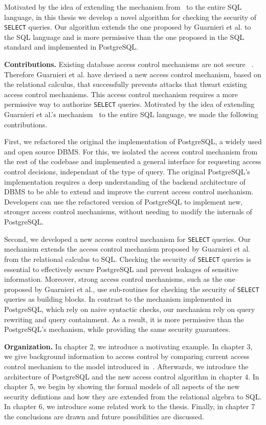 Motivated by the idea of extending the mechanism from~\cite{guarnieri2016strong} to the entire SQL language, in this thesis we develop a novel algorithm for checking the security of \texttt{SELECT} queries.
%
Our algorithm extends the one proposed by Guarnieri et al. to the SQL language and is more permissive than the one proposed in the SQL standard and  implemented in PostgreSQL.

\smallskip
\noindent
{\bf Contributions.}
Existing database access control mechanisms are not secure~\cite{guarnieri2016strong} . 
%
Therefore Guarnieri et al. have devised a new access control mechanism, based on the relational calculus, that successfully prevents attacks that thwart existing access control mechanisms.
%
This access control mechanism requires a more permissive way to authorize \texttt{SELECT} queries.
%
Motivated by the idea of extending Guarnieri et al.'s mechanism~\cite{guarnieri2016strong} to the entire SQL language,  we made the following contributions.

First, we refactored the original the implementation of PostgreSQL, a widely used and open source DBMS.
%
For this, we isolated the access control mechanism from the rest of the codebase and implemented a general interface for requesting access control decisions, independant of the type of query.
%
The original PostgreSQL's implementation requires a deep understanding of the backend architecture of DBMS to be able to extend and improve the current access control mechanism.
%
Developers can use the refactored version of PostgreSQL to implement new, stronger access control mechanisms, without needing to modify the internals of PostgreSQL.

Second, we developed a new access control mechanism for \texttt{SELECT} queries.
%
Our mechanism extends the access control mechanism proposed by Guarnieri et al.~\cite{guarnieri2016strong} from the relational calculus to SQL.
%
Checking the security of \texttt{SELECT} queries is essential to effectively secure  PostgreSQL and prevent leakages of sensitive information. 
%
Moreover, strong access control mechanisms, such as the one proposed by Guarnieri et al., use sub-routines for checking the security of \texttt{SELECT} queries as building blocks. 
%
In contrast to the mechanism implemented in PostgreSQL, which rely on naive syntactic checks, our mechanism rely on query rewriting and query containment.
%
As a result, it is more permissive than the PostgreSQL's mechanism, while providing the same security guarantees. 
%

\smallskip
\noindent
{\bf Organization.}
%
In chapter 2, we introduce a motivating example.
%
In chapter 3, we give background information to access control by comparing current access control mechanism to the model introduced in~\cite{guarnieri2016strong}.
%
Afterwards, we introduce the architecture of PostgreSQL and the new access control algorithm in chapter 4. 
%
In chapter 5, we begin by showing the formal models of all aspects of the new security defintions and how they are extended from the relational algebra to SQL.  
%
In chapter 6, we introduce some related work to the thesis. 
%
Finally, in chapter 7 the conclusions are drawn and future possibilities are discussed.